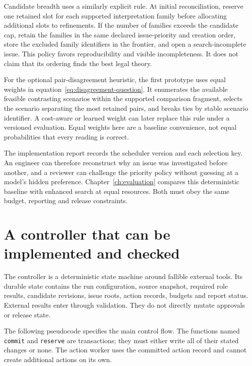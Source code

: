 Candidate breadth uses a similarly explicit rule. At initial reconciliation,
reserve one retained slot for each supported interpretation family before
allocating additional slots to refinements. If the number of families exceeds the
candidate cap, retain the families in the same declared issue-priority and
creation order, store the excluded family identifiers in the frontier, and open
a search-incomplete issue. This policy favors reproducibility and visible
incompleteness. It does not claim that its ordering finds the best legal theory.

For the optional pair-disagreement heuristic, the first prototype uses equal
weights in equation~\eqref{eq:disagreement-question}. It enumerates the available
feasible contrasting scenarios within the supported comparison fragment, selects
the scenario separating the most retained pairs, and breaks ties by stable
scenario identifier. A cost-aware or learned weight can later replace this rule
under a versioned evaluation. Equal weights here are a baseline convenience,
not equal probabilities that every reading is correct.

The implementation report records the scheduler version and each selection key.
An engineer can therefore reconstruct why an issue was investigated before
another, and a reviewer can challenge the priority policy without guessing at a
model's hidden preference. Chapter~\ref{ch:evaluation} compares this deterministic
baseline with enhanced search at equal resources. Both must obey the same budget,
reporting and release constraints.

\section{A controller that can be implemented and checked}
\label{merge:M06:15}


The controller is a deterministic state machine around fallible external tools.
Its durable state contains the run configuration, source snapshot, required role
results, candidate revisions, issue roots, action records, budgets and report
status. External results enter through validation. They do not directly mutate
approvals or release state.

The following pseudocode specifies the main control flow. The functions named
\texttt{commit} and \texttt{reserve} are transactions; they must either write all
of their stated changes or none. The action worker uses the committed action
record and cannot create additional actions on its own.

